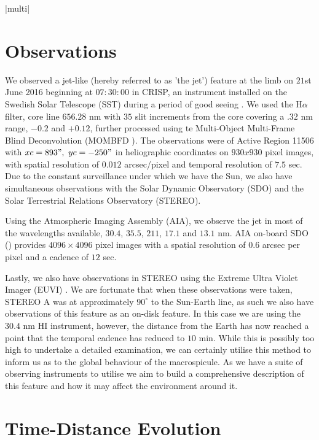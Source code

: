 \documentclass{emulateapj}
\begin{document}
\py[Onset]|multi|



\section{Observations}
\label{obs_sect}
We observed a jet-like (hereby referred to as 'the jet') feature at the limb on $21$st June 2016 beginning at $07:30:00$ in CRISP, an instrument installed on the Swedish Solar Telescope (SST) during a period of good seeing \citep{Scharmer2003}.
We used the H$\alpha$ filter, core line $656.28$ nm with $35$ slit increments from the core covering a $.32$ nm range, $-0.2$ and $+0.12$, further processed using te Multi-Object Multi-Frame Blind Deconvolution (MOMBFD \cite{vanNoort2005}).
The observations were of Active Region 11506 with $xc = 893",\ yc = -250"$ in heliographic coordinates on $930x930$ pixel images, with spatial resolution of $0.012$ arcsec/pixel and temporal resolution of $7.5$ sec.
Due to the constant surveillance under which we have the Sun, we also have simultaneous observations with the Solar Dynamic Observatory (SDO) and the Solar Terrestrial Relations Observatory (STEREO).

Using the Atmospheric Imaging Assembly (AIA), we observe the jet in most of the wavelengths available, $30.4$, $35.5$, $211$, $17.1$ and $13.1$ nm.
AIA on-board SDO (\cite{AIAspec}) provides $4096 \times 4096$ pixel images with a spatial resolution of $0.6$ arcsec per pixel and a cadence of $12$ sec.

Lastly, we also have observations in STEREO using the Extreme Ultra Violet Imager (EUVI) \citep{Defise2001}. 
We are fortunate that when these observations were taken, STEREO A was at approximately $90^\circ$ to the Sun-Earth line, as such we also have observations of this feature as an on-disk feature.
In this case we are using the $30.4$ nm HI instrument, however, the distance from the Earth has now reached a point that the temporal cadence has reduced to $10$ min.
While this is possibly too high to undertake a detailed examination, we can certainly utilise this method to inform us as to the global behaviour of the macrospicule.
As we have a suite of observing instruments to utilise we aim to build a comprehensive description of this feature and how it may affect the environment around it.


\section{Time-Distance Evolution}
\label{time_dist_sect}
\end{document}
